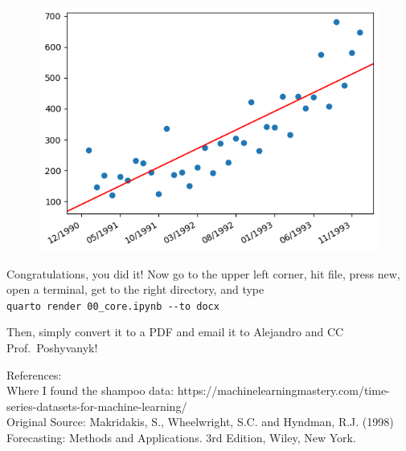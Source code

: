 \documentclass[
  letterpaper,
  DIV=11,
  numbers=noendperiod]{scrartcl}
\begin{document}
\begin{figure}[H]

{\centering \includegraphics{00_core_files/figure-pdf/cell-5-output-1.png}

}

\end{figure}

Congratulations, you did it! Now go to the upper left corner, hit file,
press new, open a terminal, get to the right directory, and type\\
\texttt{quarto\ render\ 00\_core.ipynb\ -\/-to\ docx}

Then, simply convert it to a PDF and email it to Alejandro and CC
Prof.~Poshyvanyk!

References:\\
Where I found the shampoo data:
https://machinelearningmastery.com/time-series-datasets-for-machine-learning/\\
Original Source: Makridakis, S., Wheelwright, S.C. and Hyndman, R.J.
(1998) Forecasting: Methods and Applications. 3rd Edition, Wiley, New
York.
\end{document}
